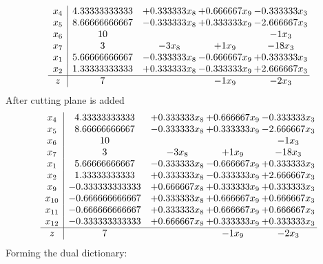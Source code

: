 \documentclass[11pt]{article}
\begin{document}
\[\begin{array}{c| c c@{\hskip 2pt} c@{\hskip 2pt} c@{\hskip 2pt} }
 x_{4}   &  4.33333333333 & + 0.333333 x_{8} & + 0.666667 x_{9} & -0.333333 x_{3}\\
 x_{5}   &  8.66666666667 & -0.333333 x_{8} & + 0.333333 x_{9} & -2.666667 x_{3}\\
 x_{6}   &  10  &    &   & -1 x_{3}\\
 x_{7}   &  3 & -3 x_{8} & + 1 x_{9} & -18 x_{3}\\
 x_{1}   &  5.66666666667 & -0.333333 x_{8} & -0.666667 x_{9} & + 0.333333 x_{3}\\
 x_{2}   &  1.33333333333 & + 0.333333 x_{8} & -0.333333 x_{9} & + 2.666667 x_{3}\\
\hline
z    &  7  &   & -1 x_{9} & -2 x_{3}\\
\end{array}\]
 After cutting plane is added 
\[\begin{array}{c| c c@{\hskip 2pt} c@{\hskip 2pt} c@{\hskip 2pt} }
 x_{4}   &  4.33333333333 & + 0.333333 x_{8} & + 0.666667 x_{9} & -0.333333 x_{3}\\
 x_{5}   &  8.66666666667 & -0.333333 x_{8} & + 0.333333 x_{9} & -2.666667 x_{3}\\
 x_{6}   &  10  &    &   & -1 x_{3}\\
 x_{7}   &  3 & -3 x_{8} & + 1 x_{9} & -18 x_{3}\\
 x_{1}   &  5.66666666667 & -0.333333 x_{8} & -0.666667 x_{9} & + 0.333333 x_{3}\\
 x_{2}   &  1.33333333333 & + 0.333333 x_{8} & -0.333333 x_{9} & + 2.666667 x_{3}\\
 x_{9}   &  -0.333333333333 & + 0.666667 x_{8} & + 0.333333 x_{9} & + 0.333333 x_{3}\\
 x_{10}   &  -0.666666666667 & + 0.333333 x_{8} & + 0.666667 x_{9} & + 0.666667 x_{3}\\
 x_{11}   &  -0.666666666667 & + 0.333333 x_{8} & + 0.666667 x_{9} & + 0.666667 x_{3}\\
 x_{12}   &  -0.333333333333 & + 0.666667 x_{8} & + 0.333333 x_{9} & + 0.333333 x_{3}\\
\hline
z    &  7  &   & -1 x_{9} & -2 x_{3}\\
\end{array}\]
Forming the dual dictionary:
\end{document}
